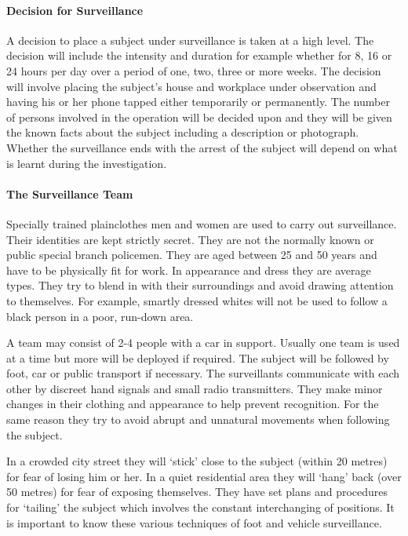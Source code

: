 \paragraph{Decision for Surveillance}

A decision to place a subject under surveillance is taken at a high
level. The decision will include the intensity and duration for example
whether for 8, 16 or 24 hours per day over a period of one, two, three
or more weeks. The decision will involve placing the subject's house and
workplace under observation and having his or her phone tapped either
temporarily or permanently. The number of persons involved in the
operation will be decided upon and they will be given the known facts
about the subject including a description or photograph. Whether the
surveillance ends with the arrest of the subject will depend on what is
learnt during the investigation.

\paragraph{The Surveillance Team}

Specially trained plainclothes men and women are used to carry out
surveillance. Their identities are kept strictly secret. They are not
the normally known or public special branch policemen. They are aged
between 25 and 50 years and have to be physically fit for work. In
appearance and dress they are average types. They try to blend in with
their surroundings and avoid drawing attention to themselves. For
example, smartly dressed whites will not be used to follow a black
person in a poor, run-down area.

A team may consist of 2-4 people with a car in support. Usually one team
is used at a time but more will be deployed if required. The subject
will be followed by foot, car or public transport if necessary. The
surveillants communicate with each other by discreet hand signals and
small radio transmitters. They make minor changes in their clothing and
appearance to help prevent recognition. For the same reason they try to
avoid abrupt and unnatural movements when following the subject.

In a crowded city street they will `stick' close to the subject (within
20 metres) for fear of losing him or her. In a quiet residential area
they will `hang' back (over 50 metres) for fear of exposing themselves.
They have set plans and procedures for `tailing' the subject which
involves the constant interchanging of positions. It is important to
know these various techniques of foot and vehicle surveillance.


